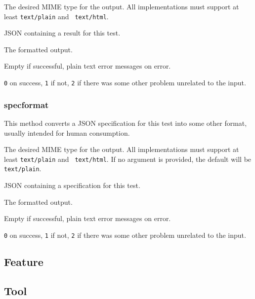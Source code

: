 \documentclass[10pt,titlepage]{article}
\begin{document}
 The desired MIME type for the output.  All
implementations must support at least {\tt text/plain} and {\tt
  text/html}.

 JSON containing a result for this test.

 The formatted output.

 Empty if successful, plain text error
messages on error.

 {\tt 0} on success, {\tt 1} if not, {\tt 2}
if there was some other problem unrelated to the input.


\subsubsection{specformat}
This method converts a JSON specification for this test into some
other format, usually intended for human consumption.

 The desired MIME type for the output.  All
implementations must support at least {\tt text/plain} and {\tt
  text/html}.  If no argument is provided, the default will be {\tt
  text/plain}.

 JSON containing a specification for this
test.

 The formatted output.

 Empty if successful, plain text error
messages on error.

 {\tt 0} on success, {\tt 1} if not, {\tt 2}
if there was some other problem unrelated to the input.


%
%
\subsection{Feature}






%
%
\subsection{Tool}
\end{document}
